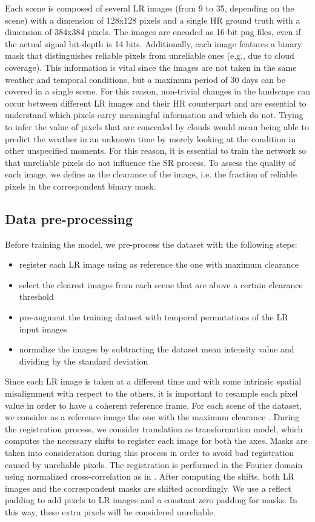 \documentclass[journal]{IEEEtran}
\begin{document}
Each scene is composed of several LR images (from 9 to 35, depending on the scene) with a dimension of 128x128 pixels and a single HR ground truth with a dimension of 384x384 pixels. The images are encoded as 16-bit png files, even if the actual signal bit-depth is 14 bits. Additionally, each image features a binary mask that distinguishes reliable pixels from unreliable ones (e.g., due to cloud coverage). This information is vital since the images are not taken in the same weather and temporal conditions, but a maximum period of 30 days can be covered in a single scene. For this reason, non-trivial changes in the landscape can occur between different LR images and their HR counterpart and are essential to understand which pixels carry meaningful information and which do not. Trying to infer the value of pixels that are concealed by clouds would mean being able to predict the weather in an unknown time by merely looking at the condition in other unspecified moments. For this reason, it is essential to train the network so that unreliable pixels do not influence the SR process. To assess the quality of each image, we define  as the clearance of the image, i.e. the fraction of reliable pixels in the correspondent binary mask.

\subsection{Data pre-processing}
\label{sec:preprocessing}
Before training the model, we pre-process the dataset with the following steps:
\begin{itemize}
    \item register each LR image using as reference the one with maximum clearance 
    \item select the clearest  images from each scene that are above a certain clearance threshold 
    \item pre-augment the training dataset with  temporal permutations of the LR input images
    \item normalize the images by subtracting the dataset mean intensity value and dividing by the standard deviation
\end{itemize}
Since each LR image is taken at a different time and with some intrinsic spatial misalignment with respect to the others, it is important to resample each pixel value in order to have a coherent reference frame. For each scene of the dataset, we consider as a reference image the one with the maximum clearance . During the registration process, we consider translation as transformation model, which computes the necessary shifts to register each image for both the axes. Masks are taken into consideration during this process in order to avoid bad registration caused by unreliable pixels. The registration is performed in the Fourier domain using normalized cross-correlation as in \cite{padfield2011masked}. After computing the shifts, both LR images and the correspondent masks are shifted accordingly. We use a reflect padding to add pixels to LR images and a constant zero padding for masks. In this way, these extra pixels will be considered unreliable.
\end{document}
